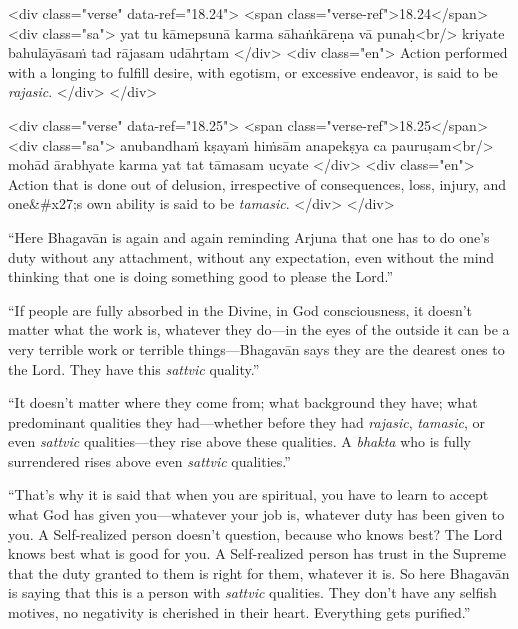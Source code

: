 \begin{html}
<div class="verse" data-ref="18.24">
  <span class="verse-ref">18.24</span>
  <div class="sa">
    yat tu kāmepsunā karma sāhaṅkāreṇa vā punaḥ<br/>
    kriyate bahulāyāsaṁ tad rājasam udāhṛtam
  </div>
  <div class="en">
    Action performed with a longing to fulfill desire, with egotism, or excessive endeavor, is said to be \textit{rajasic}.
  </div>
</div>
\end{html}



\begin{html}
<div class="verse" data-ref="18.25">
  <span class="verse-ref">18.25</span>
  <div class="sa">
    anubandhaṁ kṣayaṁ hiṁsām anapekṣya ca pauruṣam<br/>
    mohād ārabhyate karma yat tat tāmasam ucyate
  </div>
  <div class="en">
    Action that is done out of delusion, irrespective of consequences, loss, injury, and one&#x27;s own ability is said to be \textit{tamasic}.
  </div>
</div>
\end{html}


\enquote{Here Bhagavān is again and again reminding Arjuna that one has to do one’s duty without any attachment, without any expectation, even without the mind thinking that one is doing something good to please the Lord.}

\enquote{If people are fully absorbed in the Divine, in God consciousness, it doesn’t matter what the work is, whatever they do---in the eyes of the outside it can be a very terrible work or terrible things---Bhagavān says they are the dearest ones to the Lord. They have this \textit{sattvic} quality.}

\enquote{It doesn’t matter where they come from; what background they have; what predominant qualities they had---whether before they had \textit{rajasic}, \textit{tamasic}, or even \textit{sattvic} qualities---they rise above these qualities. A \textit{bhakta} who is fully surrendered rises above even \textit{sattvic} qualities.}

\enquote{That’s why it is said that when you are spiritual, you have to learn to accept what God has given you---whatever your job is, whatever duty has been given to you. A Self-realized person doesn’t question, because who knows best? The Lord knows best what is good for you. A Self-realized person has trust in the Supreme that the duty granted to them is right for them, whatever it is. So here Bhagavān is saying that this is a person with \textit{sattvic} qualities. They don’t have any selfish motives, no negativity is cherished in their heart. Everything gets purified.}

